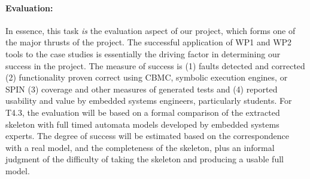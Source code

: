 \paragraph{Evaluation:} In essence, this task \emph{is} the evaluation
aspect of our project, which forms one of the major thrusts of
the project.  The successful application of WP1 and WP2 tools to the case studies is
essentially the driving factor in determining our success in the
project.
The measure of success is (1) faults detected and corrected (2) functionality
proven correct using CBMC, symbolic execution engines, or SPIN (3) coverage and other measures
of generated tests and (4) reported usability and value by embedded
systems engineers, particularly students.  For T4.3, the evaluation
will be based on a formal comparison of the extracted skeleton with
full timed automata models developed by embedded systems experts. The
degree of 
success will be estimated based on the correspondence with a real model, and the completeness of
the skeleton, plus an informal judgment of the difficulty of taking
the skeleton and producing a usable full model.


